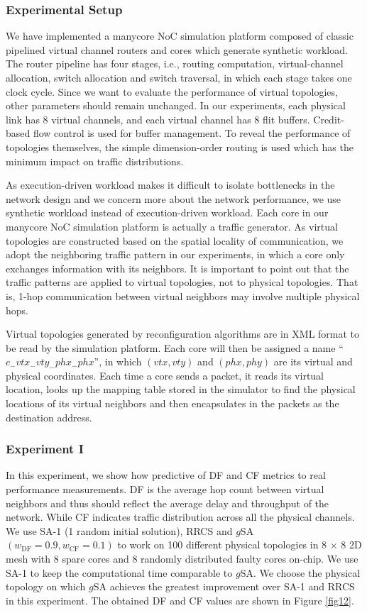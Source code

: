 \subsubsection{Experimental Setup}
We have implemented a manycore NoC simulation platform composed of classic pipelined virtual channel routers and cores which generate synthetic workload. The router pipeline has four stages, i.e., routing computation, virtual-channel allocation, switch allocation and switch traversal, in which each stage takes one clock cycle. Since we want to evaluate the performance of virtual topologies, other parameters should remain unchanged. In our experiments, each physical link has 8 virtual channels, and each virtual channel has 8 flit buffers. Credit-based flow control is used for buffer management. To reveal the performance of topologies themselves, the simple dimension-order routing is used which has the minimum impact on traffic distributions.

As execution-driven workload makes it difficult to isolate bottlenecks in the network design \cite{dally2004principles} and we concern more about the network performance, we use synthetic workload instead of execution-driven workload. Each core in our manycore NoC simulation platform is actually a traffic generator. As virtual topologies are constructed based on the spatial locality of communication, we adopt the neighboring traffic pattern in our experiments, in which a core only exchanges information with its neighbors. It is important to point out that the traffic patterns are applied to virtual topologies, not to physical topologies. That is, 1-hop communication between virtual neighbors may involve multiple physical hops.

Virtual topologies generated by reconfiguration algorithms are in XML format to be read by the simulation platform. Each core will then be assigned a name “$c_{-} v t x_{-} v t y_{-} p h x_{-} p h x$”, in which $(v t x, v t y)$  and $(phx, phy)$ are its virtual and physical coordinates. Each time a core sends a packet, it reads its virtual location, looks up the mapping table stored in the simulator to find the physical locations of its virtual neighbors and then encapsulates in the packets as the destination address.

\subsubsection{Experiment I}
In this experiment, we show how predictive of DF and CF metrics to real performance measurements. DF is the average hop count between virtual neighbors and thus should reflect the average delay and throughput of the network. While CF indicates traffic distribution across all the physical channels. We use SA-1 (1 random initial solution), RRCS and $g$SA $\left(w_{\mathrm{DF}}=0.9, w_{\mathrm{CF}}=0.1\right)$  to work on 100 different physical topologies in 8 $\times$ 8 2D mesh with 8 spare cores and 8 randomly distributed faulty cores on-chip. We use SA-1 to keep the computational time comparable to $g$SA. We choose the physical topology on which $g$SA achieves the greatest improvement over SA-1 and RRCS in this experiment. The obtained DF and CF values are shown in Figure \ref{fig12}.

